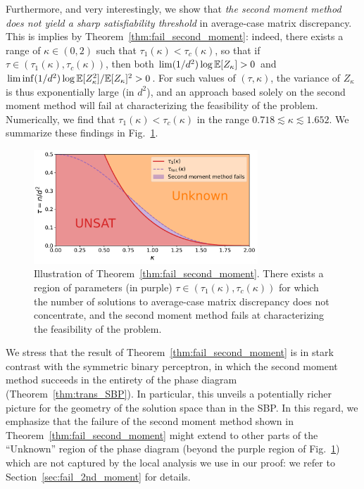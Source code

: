 {\myskip
Furthermore, and very interestingly, we show that \emph{the second moment method does not yield a sharp satisfiability threshold} in average-case matrix discrepancy. 
This is implies by Theorem~\ref{thm:fail_second_moment}: indeed, 
there exists a range of $\kappa \in (0,2)$ such that 
$\tau_1(\kappa) < \tau_{c}(\kappa)$, so that if $\tau \in (\tau_1(\kappa), \tau_c(\kappa))$, 
then both $\lim (1/d^2) \log \mathbb{E}[Z_\kappa] > 0$ and $\liminf (1/d^2) \log \mathbb{E}[Z_\kappa^2]/\mathbb{E}[Z_\kappa]^2 > 0$.
For such values of $(\tau, \kappa)$, the variance of $Z_\kappa$ is thus exponentially large (in $d^2$), and an approach based solely on the second moment method 
will fail at characterizing the feasibility of the problem.
Numerically, we find  that $\tau_1(\kappa) < \tau_c(\kappa)$ in the range $0.718 \lesssim \kappa \lesssim 1.652$. We summarize these findings in Fig.~\ref{fig:fail_second_moment}.
\begin{figure}[!t]
    \centering
    \includegraphics[width=0.75\textwidth]{figures/fail_second_moment.pdf}
    \caption{
        Illustration of Theorem~\ref{thm:fail_second_moment}. There exists a region of parameters (in purple) $\tau \in (\tau_1(\kappa), \tau_c(\kappa))$
        for which the number of solutions to average-case matrix discrepancy does not concentrate, and the second moment method fails at characterizing the feasibility of the problem.
    \label{fig:fail_second_moment}}
\end{figure}

\myskip
We stress that the result of Theorem~\ref{thm:fail_second_moment} is in stark contrast with the symmetric binary perceptron, in 
which the second moment method succeeds in the entirety of the phase diagram (Theorem~\ref{thm:trans_SBP}).
In particular, this unveils a potentially richer picture for the geometry of the solution space than in the SBP.
In this regard, we emphasize that the failure of the second moment method shown in Theorem~\ref{thm:fail_second_moment} might extend to other parts of the ``Unknown'' region of the phase diagram
(beyond the purple region of Fig.~\ref{fig:fail_second_moment}) 
which are not captured by the local analysis we use in our proof: we refer to Section~\ref{sec:fail_2nd_moment} for details.
}

